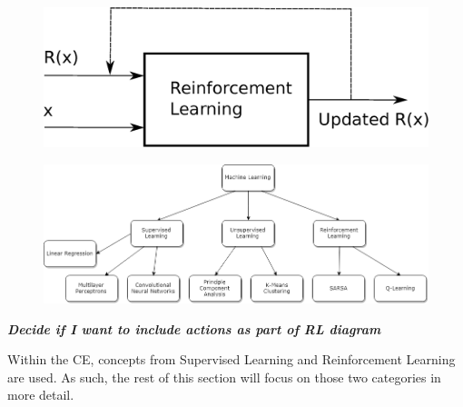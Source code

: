 \documentclass[11pt]{report}
\begin{document}
	\begin{figure}[ht]
	\centering
	\includegraphics[scale=0.4]{figures/reinforcementLearningBlock.eps}
	\end{figure}
	\begin{figure}[ht]
		\centering
		\includegraphics[scale=0.5]{figures/MLdiagram.png}
	\end{figure}
	\par \textbf{\textit{Decide if I want to include actions as part of RL diagram}}
	
	\par Within the CE, concepts from Supervised Learning and Reinforcement Learning are used. As such, the rest of this section will focus on those two categories in more detail. 
\end{document}
